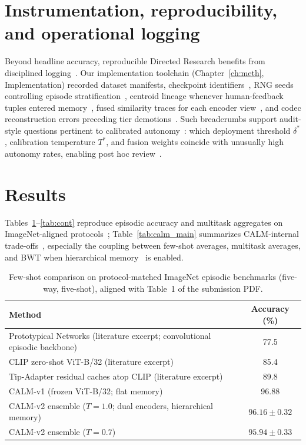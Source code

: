 \documentclass[12pt,a4paper]{report}
\begin{document}
\section{Instrumentation, reproducibility, and operational logging}
Beyond headline accuracy, reproducible Directed Research benefits from disciplined logging~\cite{r24,r19}. Our implementation toolchain (Chapter~\ref{ch:meth}, Implementation) recorded dataset manifests, checkpoint identifiers~\cite{r1}, RNG seeds controlling episode stratification~\cite{r2}, centroid lineage whenever human-feedback tuples entered memory~\cite{r24}, fused similarity traces for each encoder view~\cite{r21}, and codec reconstruction errors preceding tier demotions~\cite{r31,r32}. Such breadcrumbs support audit-style questions pertinent to calibrated autonomy~\cite{r10,r26}: which deployment threshold $\delta^\ast$, calibration temperature $T^\ast$, and fusion weights coincide with unusually high autonomy rates, enabling post hoc review~\cite{r24}.

\section{Results}
Tables~\ref{tab:fewshot}--\ref{tab:cont} reproduce episodic accuracy and multitask aggregates on ImageNet-aligned protocols~\cite{r2}; Table~\ref{tab:calm_main} summarizes CALM-internal trade-offs~\cite{r19}, especially the coupling between few-shot averages, multitask averages, and BWT when hierarchical memory~\cite{r31,r32} is enabled.

\begin{table}[htbp]
  \centering
  \caption{Few-shot comparison on protocol-matched ImageNet episodic benchmarks (five-way, five-shot), aligned with Table~1 of the submission PDF.}
  \label{tab:fewshot}
  \begin{tabular}{lc}
    \toprule
    Method & Accuracy (\%) \\
    \midrule
    Prototypical Networks (literature excerpt; convolutional episodic backbone)~\cite{r3} & 77.5 \\
    CLIP zero-shot ViT-B/32 (literature excerpt)~\cite{r1} & 85.4 \\
    Tip-Adapter residual caches atop CLIP (literature excerpt)~\cite{r4} & 89.8 \\
    \midrule
    CALM-v1 (frozen ViT-B/32; flat memory) & 96.88 \\
    CALM-v2 ensemble ($T{=}1.0$; dual encoders, hierarchical memory) & $96.16 \pm 0.32$ \\
    CALM-v2 ensemble ($T{=}0.7$) & $95.94 \pm 0.33$ \\
    \bottomrule
  \end{tabular}
\end{table}
\end{document}
